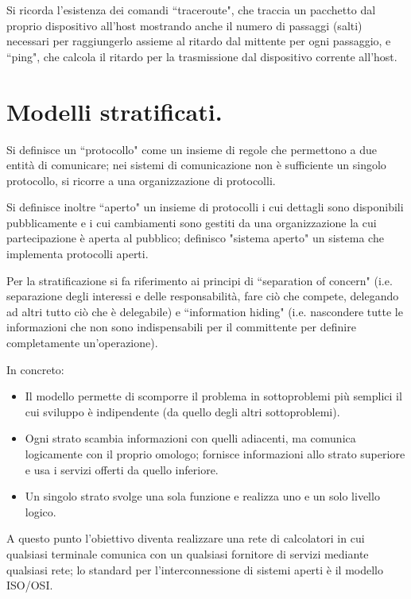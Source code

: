 \documentclass[11pt, italian, openany]{book}
\begin{document}
\begin{sloppypar}
Si ricorda l'esistenza dei comandi ``traceroute", che traccia un pacchetto dal proprio dispositivo all'host mostrando anche il numero di passaggi
(salti) necessari per raggiungerlo assieme al ritardo dal mittente per ogni passaggio, e ``ping", che calcola il ritardo per la trasmissione dal
dispositivo corrente all'host.

\section{Modelli stratificati.}
Si definisce un ``protocollo" come un insieme di regole che permettono a due entit\`a di comunicare; nei sistemi di comunicazione non \`e
sufficiente un singolo protocollo, si ricorre a una organizzazione di protocolli.

Si definisce inoltre ``aperto" un insieme di protocolli i cui dettagli sono disponibili pubblicamente e i cui cambiamenti sono gestiti da una
organizzazione la cui partecipazione \`e aperta al pubblico; definisco "sistema aperto" un sistema che implementa protocolli aperti.

Per la stratificazione si fa riferimento ai principi di ``separation of concern" (i.e. separazione degli interessi e delle responsabilit\`a, fare
ci\`o che compete, delegando ad altri tutto ci\`o che \`e delegabile) e ``information hiding" (i.e. nascondere tutte le informazioni che non sono
indispensabili per il committente per definire completamente un'operazione).

In concreto:
\begin{itemize}[topsep=0pt]
	\itemsep-0.3em
	\item Il modello permette di scomporre il problema in sottoproblemi pi\`u semplici il cui sviluppo \`e indipendente (da quello degli altri
	sottoproblemi).
	\item Ogni strato scambia informazioni con quelli adiacenti, ma comunica logicamente con il proprio omologo; fornisce informazioni allo strato
	superiore e usa i servizi offerti da quello inferiore.
	\item Un singolo strato svolge una sola funzione e realizza uno e un solo livello logico.
\end{itemize}

A questo punto l'obiettivo diventa realizzare una rete di calcolatori in cui qualsiasi terminale comunica con un qualsiasi fornitore di servizi
mediante qualsiasi rete; lo standard per l'interconnessione di sistemi aperti \`e il modello ISO/OSI.


\end{sloppypar}
\end{document}
